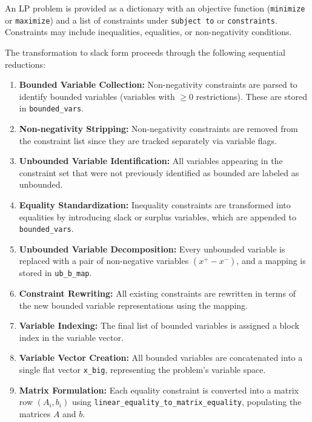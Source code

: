 \documentclass[conference]{IEEEtran}
\begin{document}
An LP problem is provided as a dictionary with an objective function (\texttt{minimize} or \texttt{maximize}) and a list of constraints under \texttt{subject to} or \texttt{constraints}. Constraints may include inequalities, equalities, or non-negativity conditions.

The transformation to slack form proceeds through the following sequential reductions:

\begin{enumerate}
    \item \textbf{Bounded Variable Collection:} Non-negativity constraints are parsed to identify bounded variables (variables with $\geq 0$ restrictions). These are stored in \texttt{bounded\_vars}.
    
    \item \textbf{Non-negativity Stripping:} Non-negativity constraints are removed from the constraint list since they are tracked separately via variable flags.
        
    \item \textbf{Unbounded Variable Identification:} All variables appearing in the constraint set that were not previously identified as bounded are labeled as unbounded.
    
    \item \textbf{Equality Standardization:} Inequality constraints are transformed into equalities by introducing slack or surplus variables, which are appended to \texttt{bounded\_vars}.
    
    \item \textbf{Unbounded Variable Decomposition:} Every unbounded variable is replaced with a pair of non-negative variables $(x^+ - x^-)$, and a mapping is stored in \texttt{ub\_b\_map}.
    
    \item \textbf{Constraint Rewriting:} All existing constraints are rewritten in terms of the new bounded variable representations using the mapping.
    
    \item \textbf{Variable Indexing:} The final list of bounded variables is assigned a block index in the variable vector.
    
    \item \textbf{Variable Vector Creation:} All bounded variables are concatenated into a single flat vector \texttt{x\_big}, representing the problem’s variable space.
    
    \item \textbf{Matrix Formulation:} Each equality constraint is converted into a matrix row $(A_i, b_i)$ using \texttt{linear\_equality\_to\_matrix\_equality}, populating the matrices $A$ and $b$.


\end{enumerate}
\end{document}
